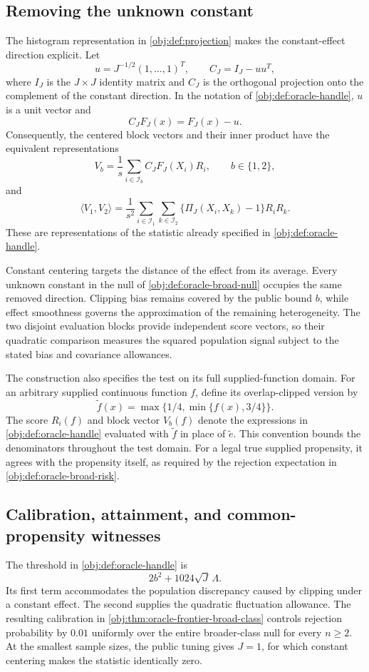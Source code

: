 \subsection{Removing the unknown constant}

The histogram representation in \cref{obj:def:projection} makes the constant-effect direction explicit. Let
\[
u=J^{-1/2}(1,\ldots,1)^T,
\qquad
C_J=I_J-uu^T,
\]
where \(I_J\) is the \(J\times J\) identity matrix and \(C_J\) is the orthogonal projection onto the complement of the constant direction. In the notation of \cref{obj:def:oracle-handle}, \(u\) is a unit vector and
\[
C_JF_J(x)=F_J(x)-u.
\]
Consequently, the centered block vectors and their inner product have the equivalent representations
\[
V_b=\frac1s\sum_{i\in\mathcal I_b}C_JF_J(X_i)R_i,
\qquad b\in\{1,2\},
\]
and
\[
\langle V_1,V_2\rangle
=
\frac1{s^2}
\sum_{i\in\mathcal I_1}\sum_{k\in\mathcal I_2}
\bigl\{\Pi_J(X_i,X_k)-1\bigr\}R_iR_k.
\]
These are representations of the statistic already specified in \cref{obj:def:oracle-handle}.

Constant centering targets the distance of the effect from its average. Every unknown constant in the null of \cref{obj:def:oracle-broad-null} occupies the same removed direction. Clipping bias remains covered by the public bound \(b\), while effect smoothness governs the approximation of the remaining heterogeneity. The two disjoint evaluation blocks provide independent score vectors, so their quadratic comparison measures the squared population signal subject to the stated bias and covariance allowances.

The construction also specifies the test on its full supplied-function domain. For an arbitrary supplied continuous function \(f\), define its overlap-clipped version by
\[
\widetilde f(x)=\max\{1/4,\min\{f(x),3/4\}\}.
\]
The score \(R_i(f)\) and block vector \(V_b(f)\) denote the expressions in \cref{obj:def:oracle-handle} evaluated with \(\widetilde f\) in place of \(\widetilde e\). This convention bounds the denominators throughout the test domain. For a legal true supplied propensity, it agrees with the propensity itself, as required by the rejection expectation in \cref{obj:def:oracle-broad-risk}.

\subsection{Calibration, attainment, and common-propensity witnesses}

The threshold in \cref{obj:def:oracle-handle} is
\[
2b^2+1024\sqrt J\,\Lambda.
\]
Its first term accommodates the population discrepancy caused by clipping under a constant effect. The second supplies the quadratic fluctuation allowance. The resulting calibration in \cref{obj:thm:oracle-frontier-broad-class} controls rejection probability by \(0.01\) uniformly over the entire broader-class null for every \(n\ge2\). At the smallest sample sizes, the public tuning gives \(J=1\), for which constant centering makes the statistic identically zero.

